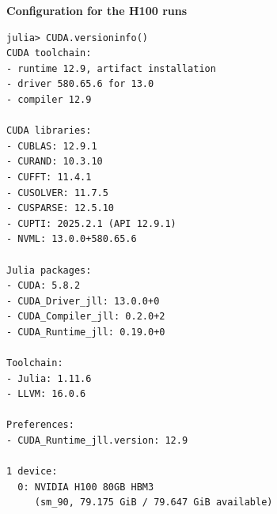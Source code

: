 \noindent \textbf{Configuration for the H100 runs}

{\small \begin{verbatim}
julia> CUDA.versioninfo()
CUDA toolchain: 
- runtime 12.9, artifact installation
- driver 580.65.6 for 13.0
- compiler 12.9

CUDA libraries: 
- CUBLAS: 12.9.1
- CURAND: 10.3.10
- CUFFT: 11.4.1
- CUSOLVER: 11.7.5
- CUSPARSE: 12.5.10
- CUPTI: 2025.2.1 (API 12.9.1)
- NVML: 13.0.0+580.65.6

Julia packages: 
- CUDA: 5.8.2
- CUDA_Driver_jll: 13.0.0+0
- CUDA_Compiler_jll: 0.2.0+2
- CUDA_Runtime_jll: 0.19.0+0

Toolchain:
- Julia: 1.11.6
- LLVM: 16.0.6

Preferences:
- CUDA_Runtime_jll.version: 12.9

1 device:
  0: NVIDIA H100 80GB HBM3
     (sm_90, 79.175 GiB / 79.647 GiB available)
\end{verbatim}}


